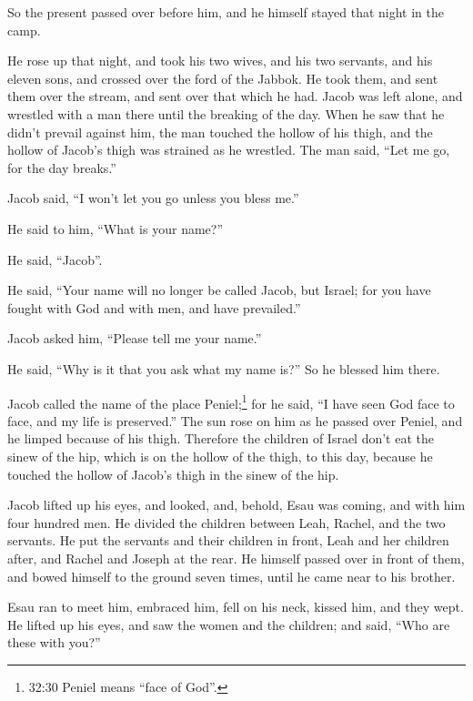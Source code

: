 \myverse{}So the present passed over before him, and he himself stayed that night in the camp.

\myverse{}He rose up that night, and took his two wives, and his two servants, and his eleven sons, and crossed over the ford of the Jabbok. \myverse{}He took them, and sent them over the stream, and sent over that which he had. \myverse{}Jacob was left alone, and wrestled with a man there until the breaking of the day. \myverse{}When he saw that he didn’t prevail against him, the man touched the hollow of his thigh, and the hollow of Jacob’s thigh was strained as he wrestled. \myverse{}The man said, “Let me go, for the day breaks.”

Jacob said, “I won’t let you go unless you bless me.”

\myverse{}He said to him, “What is your name?”

He said, “Jacob”.

\myverse{}He said, “Your name will no longer be called Jacob, but Israel; for you have fought with God and with men, and have prevailed.”

\myverse{}Jacob asked him, “Please tell me your name.”

He said, “Why is it that you ask what my name is?” So he blessed him there.

\myverse{}Jacob called the name of the place Peniel;\footnote{32:30 Peniel means “face of God”.} for he said, “I have seen God face to face, and my life is preserved.” \myverse{}The sun rose on him as he passed over Peniel, and he limped because of his thigh. \myverse{}Therefore the children of Israel don’t eat the sinew of the hip, which is on the hollow of the thigh, to this day, because he touched the hollow of Jacob’s thigh in the sinew of the hip.

\mychapter{}
\myverse*{}Jacob lifted up his eyes, and looked, and, behold, Esau was coming, and with him four hundred men. He divided the children between Leah, Rachel, and the two servants.   \myverse{}He put the servants and their children in front, Leah and her children after, and Rachel and Joseph at the rear.   \myverse{}He himself passed over in front of them, and bowed himself to the ground seven times, until he came near to his brother.

\myverse{}Esau ran to meet him, embraced him, fell on his neck, kissed him, and they wept.   \myverse{}He lifted up his eyes, and saw the women and the children; and said, “Who are these with you?”

